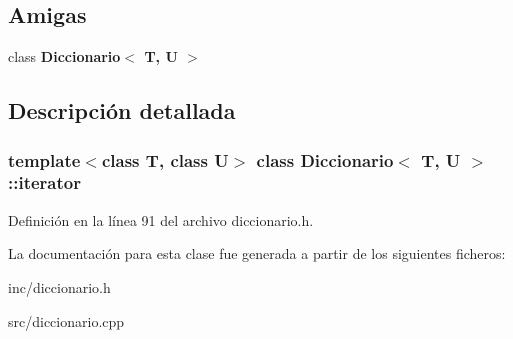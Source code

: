 \subsection*{Amigas}
\begin{DoxyCompactItemize}
\item 
\mbox{\label{classDiccionario_1_1iterator_ae50c4dcf749ac5c49596da52815dfa85}} 
class {\bfseries Diccionario$<$ T, U $>$}
\end{DoxyCompactItemize}


\subsection{Descripción detallada}
\subsubsection*{template$<$class T, class U$>$\newline
class Diccionario$<$ T, U $>$\+::iterator}



Definición en la línea 91 del archivo diccionario.\+h.



La documentación para esta clase fue generada a partir de los siguientes ficheros\+:\begin{DoxyCompactItemize}
\item 
inc/diccionario.\+h\item 
src/diccionario.\+cpp\end{DoxyCompactItemize}
